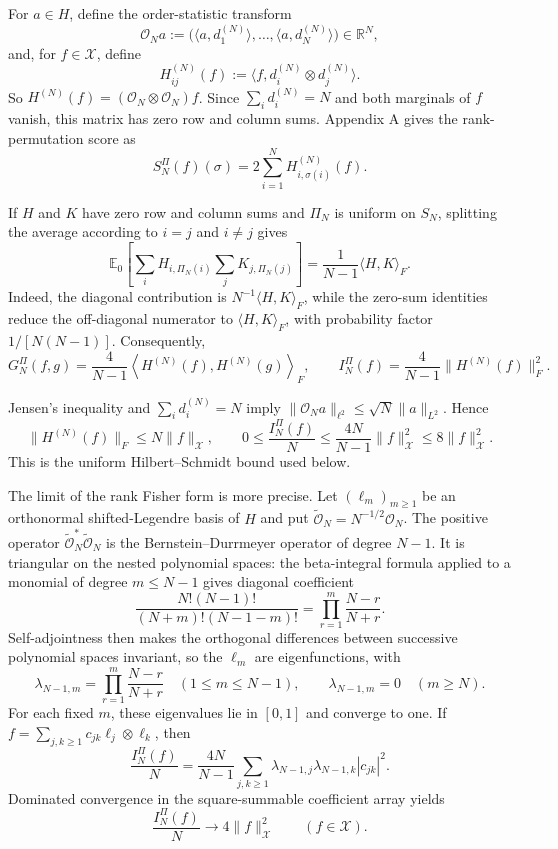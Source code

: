 \documentclass[11pt]{article}
\begin{document}
For \(a\in H\), define the order-statistic transform \[ \mathcal O_Na :=\bigl(\langle a,d_1^{(N)}\rangle,\ldots, \langle a,d_N^{(N)}\rangle\bigr)\in\mathbb R^N, \tag{E.1} \] and, for \(f\in\mathcal X\), define \[ H_{ij}^{(N)}(f) :=\langle f,d_i^{(N)}\otimes d_j^{(N)}\rangle. \tag{E.2} \] So \(H^{(N)}(f)=(\mathcal O_N\otimes\mathcal O_N)f\). Since \(\sum_i d_i^{(N)}=N\) and both marginals of \(f\) vanish, this matrix has zero row and column sums. Appendix A gives the rank-permutation score as \[ S_N^\Pi(f)(\sigma)=2\sum_{i=1}^NH_{i,\sigma(i)}^{(N)}(f). \tag{E.3} \]

If \(H\) and \(K\) have zero row and column sums and \(\Pi_N\) is uniform on \(S_N\), splitting the average according to \(i=j\) and \(i\ne j\) gives \[ \mathbb E_0\!\left[ \sum_iH_{i,\Pi_N(i)}\sum_jK_{j,\Pi_N(j)} \right] =\frac1{N-1}\langle H,K\rangle_F. \tag{E.4} \] Indeed, the diagonal contribution is \(N^{-1}\langle H,K\rangle_F\), while the zero-sum identities reduce the off-diagonal numerator to \(\langle H,K\rangle_F\), with probability factor \(1/[N(N-1)]\). Consequently, \[ G_N^\Pi(f,g) =\frac4{N-1} \left\langle H^{(N)}(f),H^{(N)}(g)\right\rangle_F, \qquad I_N^\Pi(f)=\frac4{N-1}\|H^{(N)}(f)\|_F^2. \tag{E.5} \]

Jensen's inequality and \(\sum_i d_i^{(N)}=N\) imply \(\|\mathcal O_Na\|_{\ell^2}\le\sqrt N\|a\|_{L^2}\). Hence \[ \|H^{(N)}(f)\|_F\le N\|f\|_{\mathcal X}, \qquad 0\le\frac{I_N^\Pi(f)}N \le\frac{4N}{N-1}\|f\|_{\mathcal X}^2 \le8\|f\|_{\mathcal X}^2. \tag{E.6} \] This is the uniform Hilbert--Schmidt bound used below.

The limit of the rank Fisher form is more precise. Let \((\ell_m)_{m\ge1}\) be an orthonormal shifted-Legendre basis of \(H\) and put \(\widetilde{\mathcal O}_N=N^{-1/2}\mathcal O_N\). The positive operator \(\widetilde{\mathcal O}_N^*\widetilde{\mathcal O}_N\) is the Bernstein--Durrmeyer operator of degree \(N-1\). It is triangular on the nested polynomial spaces: the beta-integral formula applied to a monomial of degree \(m\le N-1\) gives diagonal coefficient \[ \frac{N!(N-1)!}{(N+m)!(N-1-m)!} =\prod_{r=1}^m\frac{N-r}{N+r}. \] Self-adjointness then makes the orthogonal differences between successive polynomial spaces invariant, so the \(\ell_m\) are eigenfunctions, with \[ \lambda_{N-1,m} =\prod_{r=1}^m\frac{N-r}{N+r} \quad(1\le m\le N-1), \qquad \lambda_{N-1,m}=0\quad(m\ge N). \tag{E.7} \] For each fixed \(m\), these eigenvalues lie in \([0,1]\) and converge to one. If \(f=\sum_{j,k\ge1}c_{jk}\ell_j\otimes\ell_k\), then \[ \frac{I_N^\Pi(f)}N =\frac{4N}{N-1} \sum_{j,k\ge1} \lambda_{N-1,j}\lambda_{N-1,k}|c_{jk}|^2. \tag{E.8} \] Dominated convergence in the square-summable coefficient array yields \[ \boxed{ \frac{I_N^\Pi(f)}N\longrightarrow4\|f\|_{\mathcal X}^2 \qquad(f\in\mathcal X).} \tag{E.9} \]
\end{document}
